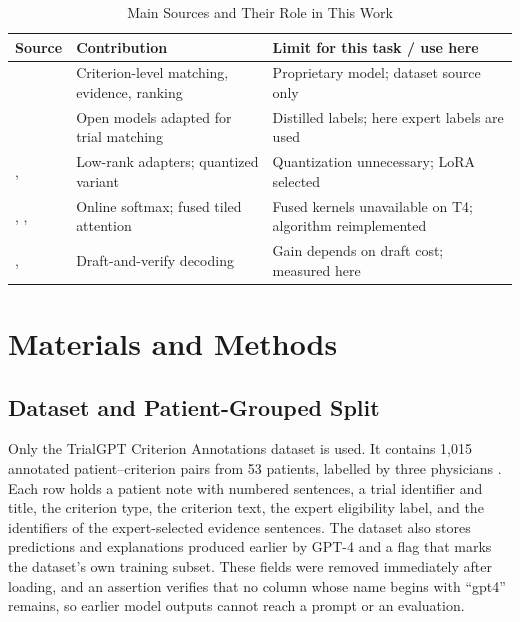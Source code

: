 \documentclass[conference]{IEEEtran}
\begin{document}
\begin{table}[!t]
\caption{Main Sources and Their Role in This Work}
\label{tab:sources}
\centering
\footnotesize
\setlength{\tabcolsep}{3pt}
\begin{tabular}{L{0.13\columnwidth}L{0.36\columnwidth}L{0.42\columnwidth}}
\toprule
Source & Contribution & Limit for this task / use here \\
\midrule
\cite{trialgpt} & Criterion-level matching, evidence, ranking & Proprietary model; dataset source only \\
\cite{nievas} & Open models adapted for trial matching & Distilled labels; here expert labels are used \\
\cite{lora}, \cite{qlora} & Low-rank adapters; quantized variant & Quantization unnecessary; LoRA selected \\
\cite{onlinesoftmax}, \cite{flash1}, \cite{flash2} & Online softmax; fused tiled attention & Fused kernels unavailable on T4; algorithm reimplemented \\
\cite{specdec}, \cite{specsamp} & Draft-and-verify decoding & Gain depends on draft cost; measured here \\
\bottomrule
\end{tabular}
\end{table}

\section{Materials and Methods}\label{sec:methods}

\subsection{Dataset and Patient-Grouped Split}
Only the TrialGPT Criterion Annotations dataset \cite{dataset} is used. It contains 1,015 annotated patient--criterion pairs from 53 patients, labelled by three physicians \cite{trialgpt}. Each row holds a patient note with numbered sentences, a trial identifier and title, the criterion type, the criterion text, the expert eligibility label, and the identifiers of the expert-selected evidence sentences. The dataset also stores predictions and explanations produced earlier by GPT-4 and a flag that marks the dataset's own training subset. These fields were removed immediately after loading, and an assertion verifies that no column whose name begins with ``gpt4'' remains, so earlier model outputs cannot reach a prompt or an evaluation.
\end{document}
